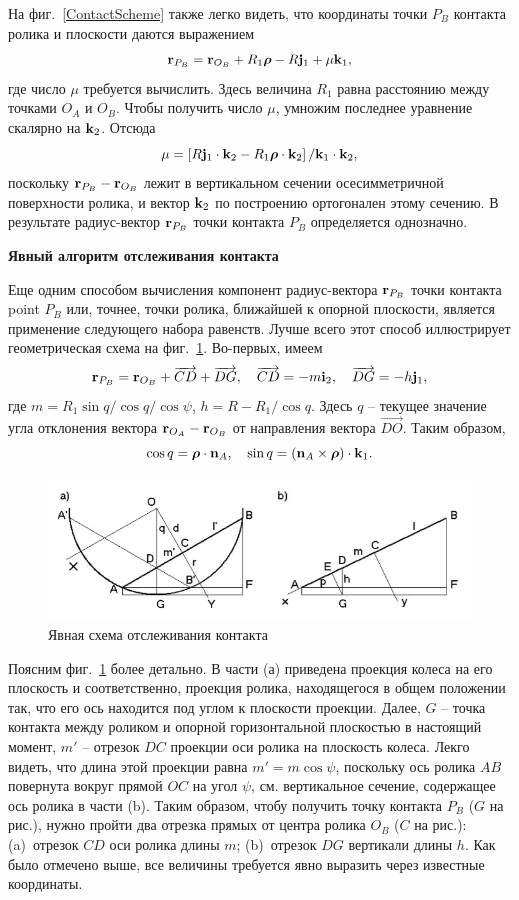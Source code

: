 На фиг.~\ref{ContactScheme} также легко видеть, что координаты точки $P_B$ контакта ролика и плоскости даются выражением
$$
{\bf r}_{P_B}={\bf r}_{O_B}+R_1\boldsymbol{\mathbf{\rho}} -R{\bf j}_1+\mu {\bf k}_1,
$$
где число $\mu$ требуется вычислить. Здесь величина $R_1$ равна расстоянию между точками $O_A$ и $O_B$.
Чтобы получить число $\mu$, умножим последнее уравнение скалярно на ${\bf k}_2$. Отсюда
$$
\mu =\left[R{\bf j}_1\cdot{\bf k}_2-R_1{\boldsymbol{\mathbf{\rho}} }\cdot {\bf k}_2\right] /
{\bf k}_1\cdot{\bf k}_2,
$$
поскольку ${\bf r}_{P_B}-{\bf r}_{O_B}$ лежит в вертикальном сечении осесимметричной поверхности ролика, и вектор ${\bf k}_2$ по построению ортогонален этому сечению. В результате радиус-вектор ${\bf r}_{P_B}$ точки контакта $P_B$ определяется однозначно.

\textbf{Явный алгоритм отслеживания контакта}

Еще одним способом вычисления компонент радиус-вектора ${\bf r}_{P_B}$ точки контакта point $P_B$ или, точнее, точки ролика, ближайшей к опорной плоскости, является применение следующего набора равенств.
Лучше всего этот способ иллюстрирует геометрическая схема на фиг.~\ref{fig:figure3}. Во-первых, имеем
$$
{\bf r}_{P_B}={\bf r}_{O_B}+\overrightarrow{CD}+\overrightarrow{DG},\quad
\overrightarrow{CD}=-m{\bf i}_2,\quad\overrightarrow{DG}=-h{\bf j}_1,
$$
где $m=R_1\sin q/\cos q/\cos\psi $, $h=R-R_1/\cos q$. Здесь $q$ -- текущее значение угла отклонения вектора ${\bf r}_{O_A}-{\bf r}_{O_B}$ от 
направления вектора $\overrightarrow{DO}$. Таким образом,
$$
\cos q=\boldsymbol{\mathbf{\rho}}\cdot{\bf n}_A,\quad\sin q=
\left({\bf n}_A\times\boldsymbol{\mathbf{\rho}}\right)\cdot {\bf k}_1.
$$
\begin{figure}[ht]
\centerline{\includegraphics[scale=0.7]{content/parts/3_friction/mo2015/stepanov.png}}
\caption{Явная схема отслеживания контакта}
\label{fig:figure3}
\end{figure}

Поясним фиг.~\ref{fig:figure3} более детально.
В части (а) приведена проекция колеса на его плоскость и соответственно, проекция ролика, находящегося в общем положении так, что его ось находится под углом к плоскости проекции.
Далее, $G$ -- точка контакта между роликом и опорной горизонтальной плоскостью в настоящий момент, $m'$ -- отрезок $DC$ проекции оси ролика на плоскость колеса. Лекго видеть, что длина этой проекции равна $m'=m\cos\psi$, поскольку ось ролика $AB$ повернута вокруг прямой $OC$ на угол $\psi$, см. вертикальное сечение, содержащее ось ролика в части (b).
Таким образом, чтобу получить точку контакта $P_B$ ($G$ на рис.), нужно пройти два отрезка прямых от центра ролика $O_B$ ($C$ на рис.): (a)~отрезок $CD$ оси ролика длины $m$; 
(b)~отрезок $DG$ вертикали длины $h$.
Как было отмечено выше, все величины требуется явно выразить через известные координаты.

